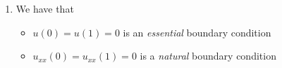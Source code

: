 \begin{enumerate}[label=(\alph*),leftmargin=*,itemsep=0mm]
\begin{proof}
    \begin{gather*}
        u = \arg\min_{w\in X}\left( \frac{1}{2}\int w_{xx}^2 \dd{x} - \int fw \dd{x} \right) \\
        X = \{ v\in H^2(\Omega) \mid v(0) = v(1) = 0, \> x \in (0,1) \}
    \end{gather*}
    
    \end{proof}
    
    \item We have that
    \begin{itemize}[noitemsep,nolistsep]
        \item $u(0) = u(1) = 0$ is an \textit{essential} boundary condition
        \item $u_{xx}(0) = u_{xx}(1) = 0$ is a \textit{natural} boundary condition
    \end{itemize}
    
\end{enumerate}